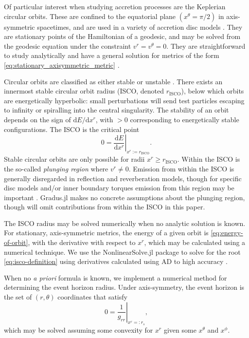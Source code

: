 \documentclass[fleqn,usenatbib]{mnras}
\newcommand{\Gradus}{Gradus.jl\xspace}
\renewcommand{\d}{\text{d}}
\newcommand{\risco}{r_\text{ISCO}}
\begin{document}
Of particular interest when studying accretion processes are the Keplerian
circular orbits. These are confined to the equatorial plane $(x^\theta = \pi/2)$
in axis-symmetric spacetimes, and are used in a variety of accretion disc models
\citep{shakura_black_1973, sadowski_relativistic_2011}. They are stationary
points of the Hamiltonian of a geodesic, and may be solved from the geodesic
equation under the constraint $v^r = v^\theta = 0$. They are straightforward to
study analytically and have a general solution for metrics of the form
\eqref{eq:stationary_axisymmetric_metric} \citep[see e.g.][and
an extension towards $a^\mu \neq 0$ in Appendix
\ref{appendix:circular-orbits}]{johannsen_regular_2013}.

Circular orbits are classified as either stable or unstable
\citep{wilkins_bound_1972,bardeen_rotating_1972}. There exists an innermost
stable circular orbit radius (ISCO, denoted $\risco$), below which orbits
are energetically hyperbolic: small perturbations will send test particles
escaping to infinity or spiralling into the central singularity. The stability of
an orbit depends on the sign of $\d E / \d x^r$, with $>0$ corresponding to
energetically stable configurations. The ISCO is the critical point
\begin{equation}
    \label{eq:isco-definition}
    0 = \left. \frac{\d E}{\d x^r} \right\rvert_{x^r := \risco}.
\end{equation}
Stable circular orbits are only possible for radii $x^r \geq \risco$. Within the
ISCO is the so-called \textit{plunging region} where $v^r \neq 0$. Emission from
within the ISCO is generally disregarded in reflection and reverberation models,
though for specific disc models and/or inner boundary torques emission from this
region may be important \citep[see e.g.][]{reynolds_isco_1997,young_isco_1998,
mummery_continuum_2024}.  \Gradus makes no concrete assumptions about the
plunging region, though will omit contributions from within the ISCO in this
paper.

The ISCO radius may be solved numerically when no analytic solution is known.
For stationary, axis-symmetric metrics, the energy of a given orbit is
\eqref{eq:energy-of-orbit}, with the derivative with respect to $x^r$, which may
be calculated using a numerical technique. We use the NonlinearSolve.jl package
to solve for the root \ref{eq:isco-definition} using derivatives calculated
using AD to high accuracy \citep{Pal_NonlinearSolve_jl_2023}.

When no \textit{a priori} formula is known, we implement a numerical method for
determining the event horizon radius.  Under axis-symmetry, the event horizon is
the set of $(r, \theta)$ coordinates that satisfy
\begin{equation}
    \label{eq:event_horizon}
    0 = \left. \frac{1}{g_{rr}} \right\rvert_{x^r =: r_s},
\end{equation}
which may be solved assuming some convexity for $x^r$ given some $x^\theta$ and
$x^\phi$.
\end{document}
